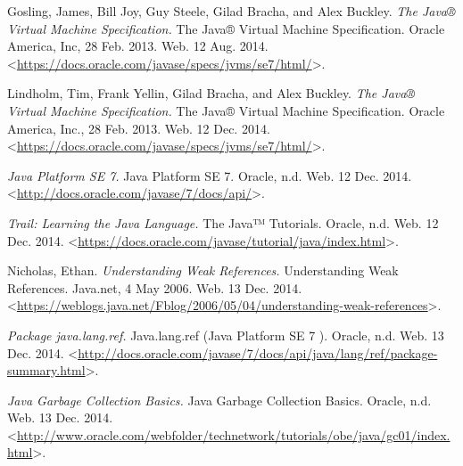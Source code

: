 

\begin{thebibliography}{9}

Gosling, James, Bill Joy, Guy Steele, Gilad Bracha, and Alex Buckley. \textit{The Java® Virtual Machine Specification.} The Java® Virtual Machine Specification. Oracle America, Inc, 28 Feb. 2013. Web. 12 Aug. 2014. <\url{https://docs.oracle.com/javase/specs/jvms/se7/html/}>.


Lindholm, Tim, Frank Yellin, Gilad Bracha, and Alex Buckley. \textit{The Java® Virtual Machine Specification.} The Java® Virtual Machine Specification. Oracle America, Inc., 28 Feb. 2013. Web. 12 Dec. 2014. <\url{https://docs.oracle.com/javase/specs/jvms/se7/html/}>.


\textit{Java Platform SE 7.} Java Platform SE 7. Oracle, n.d. Web. 12 Dec. 2014. <\url{http://docs.oracle.com/javase/7/docs/api/}>.


\textit{Trail: Learning the Java Language.} The Java™ Tutorials. Oracle, n.d. Web. 12 Dec. 2014. <\url{https://docs.oracle.com/javase/tutorial/java/index.html}>.


Nicholas, Ethan. \textit{Understanding Weak References.} Understanding Weak References. Java.net, 4 May 2006. Web. 13 Dec. 2014. <\url{https://weblogs.java.net/Fblog/2006/05/04/understanding-weak-references}>.


\textit{Package java.lang.ref.} Java.lang.ref (Java Platform SE 7 ). Oracle, n.d. Web. 13 Dec. 2014. <\url{http://docs.oracle.com/javase/7/docs/api/java/lang/ref/package-summary.html}>.


\textit{Java Garbage Collection Basics.} Java Garbage Collection Basics. Oracle, n.d. Web. 13 Dec. 2014. <\url{http://www.oracle.com/webfolder/technetwork/tutorials/obe/java/gc01/index.html}>.


\end{thebibliography}
